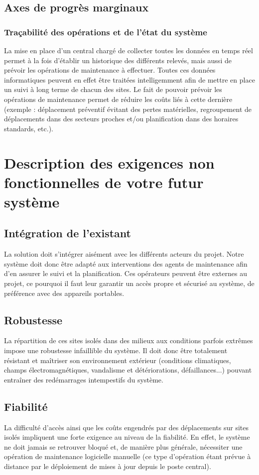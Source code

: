 \documentclass{mise_en_page}
\begin{document}
\subsection{Axes de progrès marginaux}
\subsubsection{Traçabilité des opérations et de l’état du système}
La mise en place d’un central chargé de collecter toutes les données en
temps réel permet à la fois d’établir un historique des différents
relevés, mais aussi de prévoir les opérations de maintenance à
effectuer. Toutes ces données informatiques peuvent en effet être
traitées intelligemment afin de mettre en place un suivi à long terme
de chacun des sites. Le fait de pouvoir prévoir les opérations de
maintenance permet de réduire les coûts liés à cette dernière (exemple
: déplacement préventif évitant des pertes matérielles, regroupement de
déplacements dans des secteurs proches et/ou planification dans des
horaires standards, etc.).

\section{Description des exigences non fonctionnelles de votre
futur système}
\subsection{Intégration de l’existant}
La solution doit s’intégrer aisément avec les différents acteurs du
projet. Notre système doit donc être adapté aux interventions des
agents de maintenance afin d’en assurer le suivi et la planification.
Ces opérateurs peuvent être externes au projet, ce pourquoi il faut
leur garantir un accès propre et sécurisé au système, de préférence
avec des appareils portables.

\subsection{Robustesse}
La répartition de ces sites isolés dans des milieux aux conditions
parfois extrêmes impose une robustesse infaillible du système. Il doit
donc être totalement résistant et maîtriser son environnement extérieur
(conditions climatiques, champs électromagnétiques, vandalisme et
détériorations, défaillances...) pouvant entraîner des redémarrages
intempestifs du système.

\subsection{Fiabilité}
La difficulté d’accès ainsi que les coûts engendrés par des déplacements
sur sites isolés impliquent une forte exigence au niveau de la
fiabilité. En effet, le système ne doit jamais se retrouver bloqué et,
de manière plus générale, nécessiter une opération de maintenance
logicielle manuelle (ce type d’opération étant prévue à distance par le
déploiement de mises à jour depuis le poste central).
\end{document}
